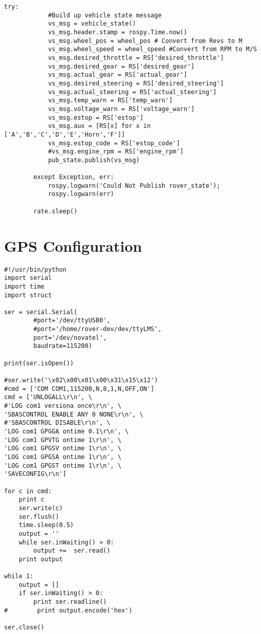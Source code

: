 \begin{lstlisting}[breaklines=true,basicstyle=\tiny]
        try:
            #Build up vehicle state message
            vs_msg = vehicle_state()
            vs_msg.header.stamp = rospy.Time.now()
            vs_msg.wheel_pos = wheel_pos # Convert from Revs to M
            vs_msg.wheel_speed = wheel_speed #Convert from RPM to M/S
            vs_msg.desired_throttle = RS['desired_throttle']
            vs_msg.desired_gear = RS['desired_gear']
            vs_msg.actual_gear = RS['actual_gear']
            vs_msg.desired_steering = RS['desired_steering']
            vs_msg.actual_steering = RS['actual_steering']
            vs_msg.temp_warn = RS['temp_warn']
            vs_msg.voltage_warn = RS['voltage_warn']
            vs_msg.estop = RS['estop']
            vs_msg.aux = [RS[x] for x in ['A','B','C','D','E','Horn','F']]
            vs_msg.estop_code = RS['estop_code']
            #vs_msg.engine_rpm = RS['engine_rpm']
            pub_state.publish(vs_msg)

        except Exception, err:
            rospy.logwarn('Could Not Publish rover_state');
            rospy.logwarn(err)

        rate.sleep()
\end{lstlisting}


\section*{GPS Configuration}
\begin{lstlisting}[breaklines=true,basicstyle=\tiny]
#!/usr/bin/python
import serial
import time
import struct

ser = serial.Serial(
        #port='/dev/ttyUSB0',
        #port='/home/rover-dev/dev/ttyLMS',
        port='/dev/novatel',
        baudrate=115200)

print(ser.isOpen())

#ser.write('\x02\x00\x01\x00\x31\x15\x12')
#cmd = ['COM COM1,115200,N,8,1,N,OFF,ON']
cmd = ['UNLOGALL\r\n', \
#'LOG com1 versiona once\r\n', \
'SBASCONTROL ENABLE ANY 0 NONE\r\n', \
#'SBASCONTROL DISABLE\r\n', \
'LOG com1 GPGGA ontime 0.1\r\n', \
'LOG com1 GPVTG ontime 1\r\n', \
'LOG com1 GPGSV ontime 1\r\n', \
'LOG com1 GPGSA ontime 1\r\n', \
'LOG com1 GPGST ontime 1\r\n', \
'SAVECONFIG\r\n']

for c in cmd:
    print c
    ser.write(c)
    ser.flush()
    time.sleep(0.5)
    output = ''
    while ser.inWaiting() > 0:
        output +=  ser.read() 
    print output

while 1:
    output = []
    if ser.inWaiting() > 0:
        print ser.readline()
#        print output.encode('hex')

ser.close()
\end{lstlisting}


